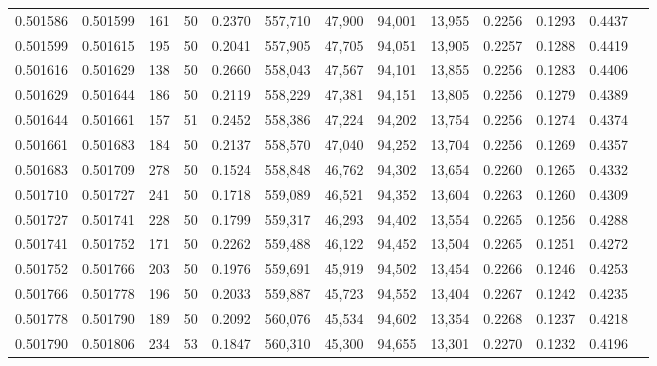 \begin{tabular}{rrrrrrrrrrrrr}
0.501586 & 0.501599 & 161 &  50 &                                     0.2370 & 557,710 &  47,900 &  94,001 &  13,955 & 0.2256 & 0.1293 & 0.4437 \\
0.501599 & 0.501615 & 195 &  50 &                                     0.2041 & 557,905 &  47,705 &  94,051 &  13,905 & 0.2257 & 0.1288 & 0.4419 \\
0.501616 & 0.501629 & 138 &  50 &                                     0.2660 & 558,043 &  47,567 &  94,101 &  13,855 & 0.2256 & 0.1283 & 0.4406 \\
0.501629 & 0.501644 & 186 &  50 &                                     0.2119 & 558,229 &  47,381 &  94,151 &  13,805 & 0.2256 & 0.1279 & 0.4389 \\
0.501644 & 0.501661 & 157 &  51 &                                     0.2452 & 558,386 &  47,224 &  94,202 &  13,754 & 0.2256 & 0.1274 & 0.4374 \\
0.501661 & 0.501683 & 184 &  50 &                                     0.2137 & 558,570 &  47,040 &  94,252 &  13,704 & 0.2256 & 0.1269 & 0.4357 \\
0.501683 & 0.501709 & 278 &  50 &                                     0.1524 & 558,848 &  46,762 &  94,302 &  13,654 & 0.2260 & 0.1265 & 0.4332 \\
0.501710 & 0.501727 & 241 &  50 &                                     0.1718 & 559,089 &  46,521 &  94,352 &  13,604 & 0.2263 & 0.1260 & 0.4309 \\
0.501727 & 0.501741 & 228 &  50 &                                     0.1799 & 559,317 &  46,293 &  94,402 &  13,554 & 0.2265 & 0.1256 & 0.4288 \\
0.501741 & 0.501752 & 171 &  50 &                                     0.2262 & 559,488 &  46,122 &  94,452 &  13,504 & 0.2265 & 0.1251 & 0.4272 \\
0.501752 & 0.501766 & 203 &  50 &                                     0.1976 & 559,691 &  45,919 &  94,502 &  13,454 & 0.2266 & 0.1246 & 0.4253 \\
0.501766 & 0.501778 & 196 &  50 &                                     0.2033 & 559,887 &  45,723 &  94,552 &  13,404 & 0.2267 & 0.1242 & 0.4235 \\
0.501778 & 0.501790 & 189 &  50 &                                     0.2092 & 560,076 &  45,534 &  94,602 &  13,354 & 0.2268 & 0.1237 & 0.4218 \\
0.501790 & 0.501806 & 234 &  53 &                                     0.1847 & 560,310 &  45,300 &  94,655 &  13,301 & 0.2270 & 0.1232 & 0.4196 \\

\end{tabular}

